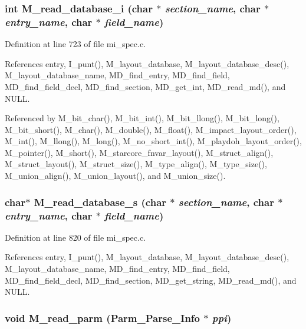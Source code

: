 \subsubsection{\setlength{\rightskip}{0pt plus 5cm}int M\_\-read\_\-database\_\-i (char $\ast$ {\em section\_\-name}, char $\ast$ {\em entry\_\-name}, char $\ast$ {\em field\_\-name})}\label{mi__spec_8c_8a1091596631acc53c7e9cd5deb2c090}




Definition at line 723 of file mi\_\-spec.c.

References entry, I\_\-punt(), M\_\-layout\_\-database, M\_\-layout\_\-database\_\-desc(), M\_\-layout\_\-database\_\-name, MD\_\-find\_\-entry, MD\_\-find\_\-field, MD\_\-find\_\-field\_\-decl, MD\_\-find\_\-section, MD\_\-get\_\-int, MD\_\-read\_\-md(), and NULL.

Referenced by M\_\-bit\_\-char(), M\_\-bit\_\-int(), M\_\-bit\_\-llong(), M\_\-bit\_\-long(), M\_\-bit\_\-short(), M\_\-char(), M\_\-double(), M\_\-float(), M\_\-impact\_\-layout\_\-order(), M\_\-int(), M\_\-llong(), M\_\-long(), M\_\-no\_\-short\_\-int(), M\_\-playdoh\_\-layout\_\-order(), M\_\-pointer(), M\_\-short(), M\_\-starcore\_\-fnvar\_\-layout(), M\_\-struct\_\-align(), M\_\-struct\_\-layout(), M\_\-struct\_\-size(), M\_\-type\_\-align(), M\_\-type\_\-size(), M\_\-union\_\-align(), M\_\-union\_\-layout(), and M\_\-union\_\-size().
\subsubsection{\setlength{\rightskip}{0pt plus 5cm}char$\ast$ M\_\-read\_\-database\_\-s (char $\ast$ {\em section\_\-name}, char $\ast$ {\em entry\_\-name}, char $\ast$ {\em field\_\-name})}\label{mi__spec_8c_4c352760c0bcdb960e445ee83f9820fa}




Definition at line 820 of file mi\_\-spec.c.

References entry, I\_\-punt(), M\_\-layout\_\-database, M\_\-layout\_\-database\_\-desc(), M\_\-layout\_\-database\_\-name, MD\_\-find\_\-entry, MD\_\-find\_\-field, MD\_\-find\_\-field\_\-decl, MD\_\-find\_\-section, MD\_\-get\_\-string, MD\_\-read\_\-md(), and NULL.
\subsubsection{\setlength{\rightskip}{0pt plus 5cm}void M\_\-read\_\-parm (\bf{Parm\_\-Parse\_\-Info} $\ast$ {\em ppi})}\label{mi__spec_8c_acde4f0596f233154e1f57b27ecca1a9}




